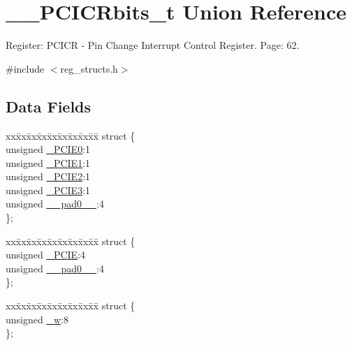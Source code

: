 \hypertarget{union_____p_c_i_c_rbits__t}{\section{\+\_\+\+\_\+\+P\+C\+I\+C\+Rbits\+\_\+t Union Reference}
\label{union_____p_c_i_c_rbits__t}
}


Register\+: P\+C\+I\+C\+R -\/ Pin Change Interrupt Control Register. Page\+: 62.  




{\ttfamily \#include $<$reg\+\_\+structs.\+h$>$}

\subsection*{Data Fields}
\begin{DoxyCompactItemize}
\item 
\begin{tabbing}
xx\=xx\=xx\=xx\=xx\=xx\=xx\=xx\=xx\=\kill
struct \{\\
\>unsigned \hyperlink{union_____p_c_i_c_rbits__t_a817692e087a6d55c58373af44f6dc26f}{\_PCIE0}:1\\
\>unsigned \hyperlink{union_____p_c_i_c_rbits__t_a6ae0886986898b4bede2a5f3f3d17099}{\_PCIE1}:1\\
\>unsigned \hyperlink{union_____p_c_i_c_rbits__t_afb35272c66954efdf211f64643186fb7}{\_PCIE2}:1\\
\>unsigned \hyperlink{union_____p_c_i_c_rbits__t_ab0a10c705c59ecfd8fd8b1dafaa03ef7}{\_PCIE3}:1\\
\>unsigned \hyperlink{union_____p_c_i_c_rbits__t_a3058fb6c864413e3bdad0d8316cf4156}{\_\_pad0\_\_}:4\\
\}; \\

\end{tabbing}\item 
\begin{tabbing}
xx\=xx\=xx\=xx\=xx\=xx\=xx\=xx\=xx\=\kill
struct \{\\
\>unsigned \hyperlink{union_____p_c_i_c_rbits__t_adc56ab50cc65cb78e3bc45288ad72b8f}{\_PCIE}:4\\
\>unsigned \hyperlink{union_____p_c_i_c_rbits__t_a3058fb6c864413e3bdad0d8316cf4156}{\_\_pad0\_\_}:4\\
\}; \\

\end{tabbing}\item 
\begin{tabbing}
xx\=xx\=xx\=xx\=xx\=xx\=xx\=xx\=xx\=\kill
struct \{\\
\>unsigned \hyperlink{union_____p_c_i_c_rbits__t_a3fbcce364039281171632bac73b552ca}{\_w}:8\\
\}; \\

\end{tabbing}\end{DoxyCompactItemize}


